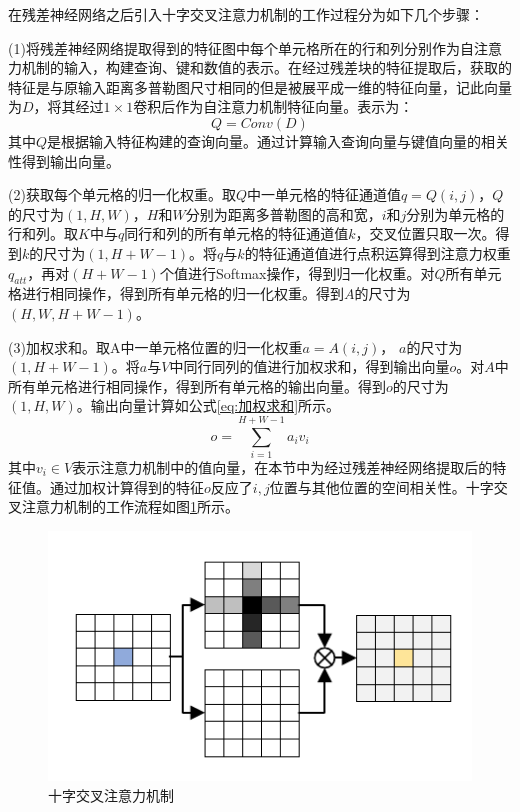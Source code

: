 在残差神经网络之后引入十字交叉注意力机制的工作过程分为如下几个步骤：
\par
(1)将残差神经网络提取得到的特征图中每个单元格所在的行和列分别作为自注意力机制的输入，构建查询、键和数值的表示。在经过残差块的特征提取后，获取的特征是与原输入距离多普勒图尺寸相同的但是被展平成一维的特征向量，记此向量为$D$，将其经过$1\times1$卷积后作为自注意力机制特征向量。表示为：
\begin{equation}
	Q=Conv(D)
\end{equation}
其中$Q$是根据输入特征构建的查询向量。通过计算输入查询向量与键值向量的相关性得到输出向量。
\par
(2)获取每个单元格的归一化权重。取$Q$中一单元格的特征通道值$q=Q(i,j)$，$Q$的尺寸为$(1,H,W)$，$H$和$W$分别为距离多普勒图的高和宽，$i$和$j$分别为单元格的行和列。取$K$中与$q$同行和列的所有单元格的特征通道值$k$，交叉位置只取一次。得到$k$的尺寸为$(1,H+W-1)$。将$q$与$k$的特征通道值进行点积运算得到注意力权重$q_{att}$，再对$(H+W-1)$个值进行Softmax操作，得到归一化权重。对$Q$所有单元格进行相同操作，得到所有单元格的归一化权重。得到$A$的尺寸为$(H,W,H+W-1)$。

\par
(3)加权求和。取A中一单元格位置的归一化权重$a=A(i,j)$， $a$的尺寸为$(1, H+W-1)$。将$a$与$V$中同行同列的值进行加权求和，得到输出向量$o$。对$A$中所有单元格进行相同操作，得到所有单元格的输出向量。得到$o$的尺寸为$(1,H,W)$。输出向量计算如公式\eqref{eq:加权求和}所示。
\begin{equation}
	\label{eq:加权求和}
	o = \sum_{i=1}^{H+W-1}a_i v_i
\end{equation}
其中$v_i \in V$表示注意力机制中的值向量，在本节中为经过残差神经网络提取后的特征值。通过加权计算得到的特征$o$反应了$i,j$位置与其他位置的空间相关性。十字交叉注意力机制的工作流程如图\ref{fig:十字交叉注意力机制}所示。
\begin{figure}[htbp]
	\centering
	\includegraphics[width=0.7\linewidth]{figures/十字交叉注意力机制.pdf}
	\caption{十字交叉注意力机制}
	\label{fig:十字交叉注意力机制}
\end{figure}


